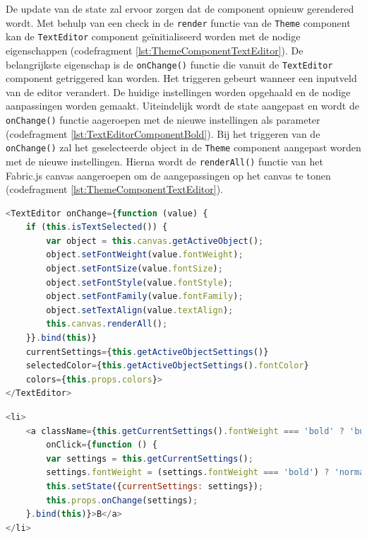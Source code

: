 De update van de state zal ervoor zorgen dat de component opnieuw gerendered wordt. Met behulp van een check in de \texttt{render} functie van de \texttt{Theme} component kan de \texttt{TextEditor} component ge\"{i}nitialiseerd worden met de nodige eigenschappen (codefragment \ref{lst:ThemeComponentTextEditor}). De belangrijkste eigenschap is de \texttt{onChange()} functie die vanuit de \texttt{TextEditor} component getriggered kan worden. Het triggeren gebeurt wanneer een inputveld van de editor verandert. De huidige instellingen worden opgehaald en de nodige aanpassingen worden gemaakt. Uiteindelijk wordt de state aangepast en wordt de \texttt{onChange()} functie aageroepen met de nieuwe instellingen als parameter (codefragment \ref{lst:TextEditorComponentBold}). Bij het triggeren van de \texttt{onChange()} zal het geselecteerde object in de \texttt{Theme} component aangepast worden met de nieuwe instellingen. Hierna wordt de \texttt{renderAll()} functie van het Fabric.js canvas aangeroepen om de aangepassingen op het canvas te tonen (codefragment \ref{lst:ThemeComponentTextEditor}).

\begin{lstlisting}[caption={Theme component - Text editor},label=lst:ThemeComponentTextEditor,language=javascript]
<TextEditor onChange={function (value) {
	if (this.isTextSelected()) {
		var object = this.canvas.getActiveObject();
		object.setFontWeight(value.fontWeight);
		object.setFontSize(value.fontSize);
		object.setFontStyle(value.fontStyle);
		object.setFontFamily(value.fontFamily);
		object.setTextAlign(value.textAlign);
		this.canvas.renderAll();
	}}.bind(this)}
	currentSettings={this.getActiveObjectSettings()}
	selectedColor={this.getActiveObjectSettings().fontColor}
	colors={this.props.colors}>
</TextEditor>
\end{lstlisting}

\begin{lstlisting}[caption={TextEditor component - toggle bold},label=lst:TextEditorComponentBold,language=javascript]
<li>
	<a className={this.getCurrentSettings().fontWeight === 'bold' ? 'button primary' : 'button'}
		onClick={function () {
		var settings = this.getCurrentSettings();
		settings.fontWeight = (settings.fontWeight === 'bold') ? 'normal' : 'bold';
		this.setState({currentSettings: settings});
		this.props.onChange(settings);
	}.bind(this)}>B</a>
</li>
\end{lstlisting}


